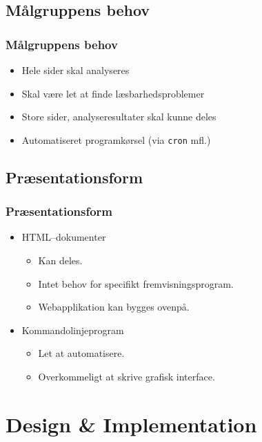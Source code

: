 \documentclass{beamer}
\begin{document}
\subsection{Målgruppens behov}
\begin{frame}
  \frametitle{Målgruppens behov}
  \begin{itemize}
  \item<1-> Hele sider skal analyseres
  \item<2-> Skal være let at finde læsbarhedsproblemer
  \item<3-> Store sider, analyseresultater skal kunne deles
  \item<4-> Automatiseret programkørsel (via \texttt{cron} mfl.)
  \end{itemize}
\end{frame}

\subsection{Præsentationsform}
\begin{frame}
  \frametitle{Præsentationsform}
  \begin{itemize}
    \item<1->HTML--dokumenter
      \begin{itemize}
      \item<2-> Kan deles.
      \item<2-> Intet behov for specifikt fremvisningsprogram.
      \item<3-> Webapplikation kan bygges ovenpå.
      \end{itemize}  

    \item<4->Kommandolinjeprogram
      \begin{itemize}
      \item<4-> Let at automatisere.
      \item<5-> Overkommeligt at skrive grafisk interface.
      \end{itemize}  
    \end{itemize}
\end{frame}

\section{Design \& Implementation}
\end{document}
